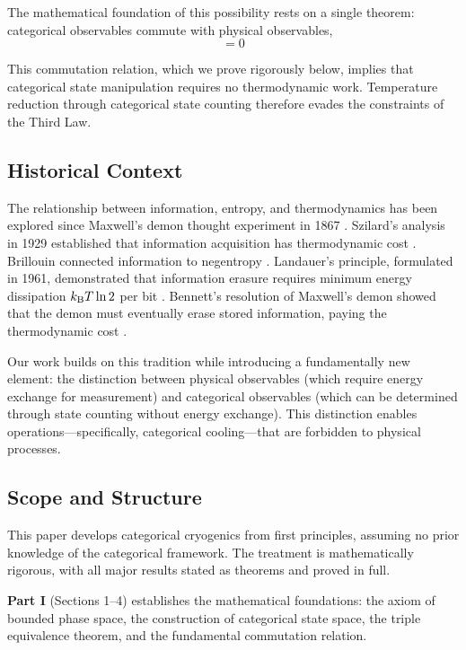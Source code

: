 The mathematical foundation of this possibility rests on a single theorem: categorical observables commute with physical observables,
\begin{equation}
[\Ocat, \Ophys] = 0
\label{eq:commutation_intro}
\end{equation}

This commutation relation, which we prove rigorously below, implies that categorical state manipulation requires no thermodynamic work. Temperature reduction through categorical state counting therefore evades the constraints of the Third Law.

\subsection{Historical Context}

The relationship between information, entropy, and thermodynamics has been explored since Maxwell's demon thought experiment in 1867 \cite{maxwell1867}. Szilard's analysis in 1929 established that information acquisition has thermodynamic cost \cite{szilard1929}. Brillouin connected information to negentropy \cite{brillouin1951}. Landauer's principle, formulated in 1961, demonstrated that information erasure requires minimum energy dissipation $k_{\mathrm{B}} T \ln 2$ per bit \cite{landauer1961}. Bennett's resolution of Maxwell's demon showed that the demon must eventually erase stored information, paying the thermodynamic cost \cite{bennett1982,bennett2003}.

Our work builds on this tradition while introducing a fundamentally new element: the distinction between physical observables (which require energy exchange for measurement) and categorical observables (which can be determined through state counting without energy exchange). This distinction enables operations---specifically, categorical cooling---that are forbidden to physical processes.

\subsection{Scope and Structure}

This paper develops categorical cryogenics from first principles, assuming no prior knowledge of the categorical framework. The treatment is mathematically rigorous, with all major results stated as theorems and proved in full.

\textbf{Part I} (Sections 1--4) establishes the mathematical foundations: the axiom of bounded phase space, the construction of categorical state space, the triple equivalence theorem, and the fundamental commutation relation.

